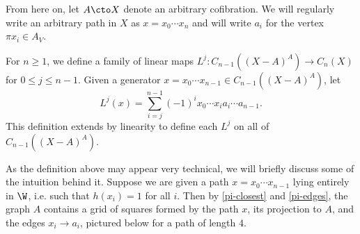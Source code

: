 From here on, let $A \cto X$ denote an arbitrary cofibration. We will regularly write an arbitrary path in $X$ as $x = x_0 \cdots x_n$ and will write $a_i$ for the vertex $\pi x_i \in A_V$.

\begin{defi}\label{L-def}
For $n \geq 1$, we define a family of linear maps $L^j \colon C_{n-1}((X - A)^A) \to C_n(X)$ for $0 \leq j \leq  n-1$. Given a generator $x = x_0 \cdots x_{n-1} \in C_{n-1}((X - A)^A)$, let
\[
L^j(x) = \sum_{i = j}^{n-1} (-1)^i x_0 \cdots x_i a_i \cdots a_{n-1}.
\]
This definition extends by linearity to define each $L^j$ on all of $C_{n-1}((X - A)^A)$.
\end{defi}

As the definition above may appear very technical, we will briefly discuss some of the intuition behind it. Suppose we are given a path $x = x_0 \cdots x_{n-1}$ lying entirely in $\W$, i.e.  such that $h(x_i) = 1$ for all $i$. Then by \cref{pi-closest} and \cref{pi-edges}, the graph $A$ contains a grid of squares formed by the path $x$, its projection to $A$, and the edges $x_i \to a_i$, pictured below for a path of length $4$.

\begin{figure}[H]
    \centering
\end{figure}

